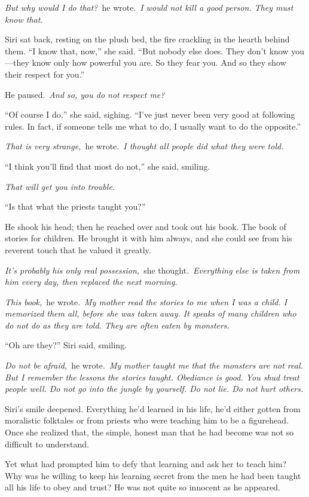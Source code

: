 \textit{But why would I do that?}~he wrote.~\textit{I would not kill a good person. They must know that.}

Siri sat back, resting on the plush bed, the fire crackling in the hearth behind them. “I know that, now,” she said. “But nobody else does. They don’t know you—they know only how powerful you are. So they fear you. And so they show their respect for you.”

He paused.~\textit{And so, you do not respect me?}

“Of course I do,” she said, sighing. “I’ve just never been very good at following rules. In fact, if someone tells me what to do, I usually want to do the opposite.”

\textit{That is very strange,}~he wrote.~\textit{I thought all people did what they were told.}

“I think you’ll find that most do not,” she said, smiling.

\textit{That will get you into trouble.}

“Is that what the priests taught you?”

He shook his head; then he reached over and took out his book. The book of stories for children. He brought it with him always, and she could see from his reverent touch that he valued it greatly.

\textit{It’s probably his only real possession,}~she thought.~\textit{Everything else is taken from him every day, then replaced the next morning.}

\textit{This book,}~he wrote.~\textit{My mother read the stories to me when I was a child. I memorized them all, before she was taken away. It speaks of many children who do not do as they are told. They are often eaten by monsters.}

“Oh are they?” Siri said, smiling.

\textit{Do not be afraid,}~he wrote.~\textit{My mother taught me that the monsters are not real. But I remember the lessons the stories taught. Obediance is good. You shud treat people well. Do not go into the jungle by yourself. Do not lie. Do not hurt others.}

Siri’s smile deepened. Everything he’d learned in his life, he’d either gotten from moralistic folktales or from priests who were teaching him to be a figurehead. Once she realized that, the simple, honest man that he had become was not so difficult to understand.

Yet what had prompted him to defy that learning and ask her to teach him? Why was he willing to keep his learning secret from the men he had been taught all his life to obey and trust? He was not quite so innocent as he appeared.

